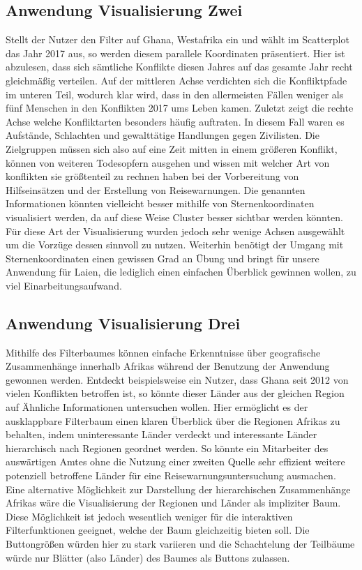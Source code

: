 \documentclass[usegeometry=true]{scrartcl}
\begin{document}
\subsection{Anwendung Visualisierung Zwei}
Stellt der Nutzer den Filter auf Ghana, Westafrika ein und wählt im Scatterplot das Jahr 2017 aus, so werden diesem parallele Koordinaten präsentiert. Hier ist abzulesen, dass sich sämtliche Konflikte diesen Jahres auf das gesamte Jahr recht gleichmäßig verteilen. Auf der mittleren Achse verdichten sich die Konfliktpfade im unteren Teil, wodurch klar wird, dass in den allermeisten Fällen weniger als fünf Menschen in den Konflikten 2017 ums Leben kamen. Zuletzt zeigt die rechte Achse welche Konfliktarten besonders häufig auftraten. In diesem Fall waren es Aufstände, Schlachten und gewalttätige Handlungen gegen Zivilisten. Die Zielgruppen müssen sich also auf eine Zeit mitten in einem größeren Konflikt, können von weiteren Todesopfern ausgehen und wissen mit welcher Art von konflikten sie größtenteil zu rechnen haben bei der Vorbereitung von Hilfseinsätzen und der Erstellung von Reisewarnungen. Die genannten Informationen könnten vielleicht besser mithilfe von Sternenkoordinaten visualisiert werden, da auf diese Weise Cluster besser sichtbar werden könnten. Für diese Art der Visualisierung wurden jedoch sehr wenige Achsen ausgewählt um die Vorzüge dessen sinnvoll zu nutzen. Weiterhin benötigt der Umgang mit Sternenkoordinaten einen gewissen Grad an Übung und bringt für unsere Anwendung für Laien, die lediglich einen einfachen Überblick gewinnen wollen, zu viel Einarbeitungsaufwand.\\

\subsection{Anwendung Visualisierung Drei}
Mithilfe des Filterbaumes können einfache Erkenntnisse über geografische Zusammenhänge innerhalb Afrikas während der Benutzung der Anwendung gewonnen werden. Entdeckt beispielsweise ein Nutzer, dass Ghana seit 2012 von vielen Konflikten betroffen ist, so könnte dieser Länder aus der gleichen Region auf Ähnliche Informationen untersuchen wollen. Hier ermöglicht es der ausklappbare Filterbaum einen klaren Überblick über die Regionen Afrikas zu behalten, indem uninteressante Länder verdeckt und interessante Länder hierarchisch nach Regionen geordnet werden. So könnte ein Mitarbeiter des auswärtigen Amtes ohne die Nutzung einer zweiten Quelle sehr effizient weitere potenziell betroffene Länder für eine Reisewarnungsuntersuchung ausmachen. Eine alternative Möglichkeit zur Darstellung der hierarchischen Zusammenhänge Afrikas wäre die Visualisierung der Regionen und Länder als impliziter Baum. Diese Möglichkeit ist jedoch wesentlich weniger für die interaktiven Filterfunktionen geeignet, welche der Baum gleichzeitig bieten soll. Die Buttongrößen würden hier zu stark variieren und die Schachtelung der Teilbäume würde nur Blätter (also Länder) des Baumes als Buttons zulassen.\\
\end{document}
